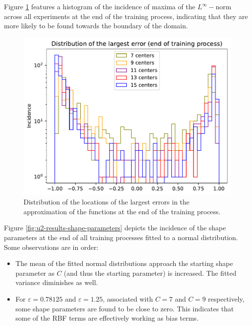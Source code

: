 \documentclass[12pt]{report} %
\begin{document}
Figure \ref{fig:u2-results-largest-error} features a histogram of the incidence of maxima of the $L^\infty-$norm across all experiments at the end of the training process, indicating that they are more likely to be found towards the boundary of the domain. 



\begin{figure}[h]
  \includegraphics[width=.7\textwidth]{imagenes/experiments/1d/statistical_1d_full_scheduler_interpolation/distribution_of_errors_L_inf_end.pdf}
  \caption{Distribution of the locations of the largest errors in the approximation of the functions at the end of the training process.}
  \label{fig:u2-results-largest-error}
\end{figure}

Figure \ref{fig:u2-results-shape-parameters} depicts the incidence of the shape parameters at the end of all training processes fitted to a normal distribution. Some observations are in order:
\begin{itemize}
  \item The mean of the fitted normal distributions approach the starting shape parameter as $C$ (and thus the starting parameter) is increased. The fitted variance diminishes as well.
  \item For $\varepsilon=0.78125$ and $\varepsilon=1.25$, associated with $C=7$ and $C=9$ respectively, some shape parameters are found to be close to zero. This indicates that some of the RBF terms are effectively working as bias terms.
\end{itemize}
\end{document}
